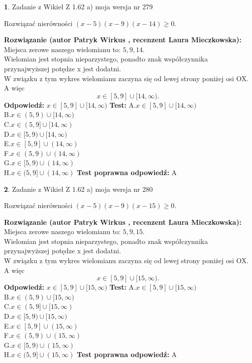 \documentclass[12pt, a4paper]{article}
\theoremstyle{definition} %
\newtheorem{zad}{}
\newcommand{\zadStart}[1]{\begin{zad}#1\newline}
\newcommand{\zadStop}{\end{zad}}
\newcommand{\rozwStart}[2]{\noindent \textbf{Rozwiązanie (autor #1 , recenzent #2): }\newline}
\newcommand{\rozwStop}{\newline}
\newcommand{\odpStart}{\noindent \textbf{Odpowiedź:}\newline}
\newcommand{\odpStop}{\newline}
\newcommand{\testStart}{\noindent \textbf{Test:}\newline}
\newcommand{\testStop}{\newline}
\newcommand{\kluczStart}{\noindent \textbf{Test poprawna odpowiedź:}\newline}
\newcommand{\kluczStop}{\newline}
\begin{document}
\zadStart{Zadanie z Wikieł Z 1.62 a) moja wersja nr 279}

Rozwiązać nierówności $(x-5)(x-9)(x-14)\ge0$.
\zadStop
\rozwStart{Patryk Wirkus}{Laura Mieczkowska}
Miejsca zerowe naszego wielomianu to: $5, 9, 14$.\\
Wielomian jest stopnia nieparzystego, ponadto znak współczynnika przy\linebreak najwyższej potędze x jest dodatni.\\ W związku z tym wykres wielomianu zaczyna się od lewej strony poniżej osi OX. A więc $$x \in [5,9] \cup [14,\infty).$$
\rozwStop
\odpStart
$x \in [5,9] \cup [14,\infty)$
\odpStop
\testStart
A.$x \in [5,9] \cup [14,\infty)$\\
B.$x \in (5,9) \cup [14,\infty)$\\
C.$x \in (5,9] \cup [14,\infty)$\\
D.$x \in [5,9) \cup [14,\infty)$\\
E.$x \in [5,9] \cup (14,\infty)$\\
F.$x \in (5,9) \cup (14,\infty)$\\
G.$x \in [5,9) \cup (14,\infty)$\\
H.$x \in (5,9] \cup (14,\infty)$
\testStop
\kluczStart
A
\kluczStop



\zadStart{Zadanie z Wikieł Z 1.62 a) moja wersja nr 280}

Rozwiązać nierówności $(x-5)(x-9)(x-15)\ge0$.
\zadStop
\rozwStart{Patryk Wirkus}{Laura Mieczkowska}
Miejsca zerowe naszego wielomianu to: $5, 9, 15$.\\
Wielomian jest stopnia nieparzystego, ponadto znak współczynnika przy\linebreak najwyższej potędze x jest dodatni.\\ W związku z tym wykres wielomianu zaczyna się od lewej strony poniżej osi OX. A więc $$x \in [5,9] \cup [15,\infty).$$
\rozwStop
\odpStart
$x \in [5,9] \cup [15,\infty)$
\odpStop
\testStart
A.$x \in [5,9] \cup [15,\infty)$\\
B.$x \in (5,9) \cup [15,\infty)$\\
C.$x \in (5,9] \cup [15,\infty)$\\
D.$x \in [5,9) \cup [15,\infty)$\\
E.$x \in [5,9] \cup (15,\infty)$\\
F.$x \in (5,9) \cup (15,\infty)$\\
G.$x \in [5,9) \cup (15,\infty)$\\
H.$x \in (5,9] \cup (15,\infty)$
\testStop
\kluczStart
A
\kluczStop
\end{document}
